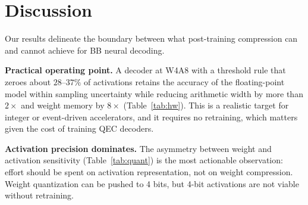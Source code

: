 ﻿\documentclass[conference]{IEEEtran}
\begin{document}
\section{Discussion}\label{sec:disc}
Our results delineate the boundary between what post-training compression
can and cannot achieve for BB neural decoding.

\textbf{Practical operating point.} A decoder at W4A8 with a threshold rule
that zeroes about $28$--$37\%$ of activations retains the accuracy of the
floating-point model within sampling uncertainty while reducing arithmetic
width by more than $2\times$ and weight memory by $8\times$ (Table~\ref{tab:hw}).
This is a realistic target for integer or event-driven accelerators, and it
requires no retraining, which matters given the cost of training QEC
decoders.

\textbf{Activation precision dominates.} The asymmetry between weight and
activation sensitivity (Table~\ref{tab:quant}) is the most actionable
observation: effort should be spent on activation representation, not on
weight compression. Weight quantization can be pushed to 4 bits, but 4-bit
activations are not viable without retraining.
\end{document}
